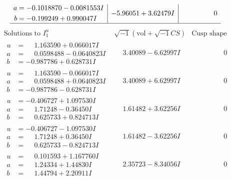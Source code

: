 \documentclass[1p]{elsarticle_modified}
\theoremstyle{definition}
\newcommand{\I}{\sqrt{-1}}
\begin{document}
$$\begin{array}{c|c|c}
\begin{aligned}
a &= -0.1018870 - 0.0081553 I \\
b &= -0.199249 + 0.990047 I\end{aligned}
 & -5.96051 + 3.62479 I & \phantom{-0.000000 } 0\\
 \hline 
 \end{array}$$\newpage$$\begin{array}{c|c|c}  
\text{Solutions to }I^u_{1}& \I (\text{vol} + \sqrt{-1}CS) & \text{Cusp shape}\\
 \hline 
\begin{aligned}
u &= \phantom{-}1.163590 + 0.066017 I \\
a &= \phantom{-}0.0598488 - 0.0640823 I \\
b &= -0.987786 + 0.628731 I\end{aligned}
 & \phantom{-}3.40089 - 6.62997 I & \phantom{-0.000000 } 0 \\ \hline\begin{aligned}
u &= \phantom{-}1.163590 - 0.066017 I \\
a &= \phantom{-}0.0598488 + 0.0640823 I \\
b &= -0.987786 - 0.628731 I\end{aligned}
 & \phantom{-}3.40089 + 6.62997 I & \phantom{-0.000000 } 0 \\ \hline\begin{aligned}
u &= -0.406727 + 1.097530 I \\
a &= \phantom{-}1.71248 - 0.36450 I \\
b &= \phantom{-}0.625733 + 0.824713 I\end{aligned}
 & \phantom{-}1.61482 + 3.62256 I & \phantom{-0.000000 } 0 \\ \hline\begin{aligned}
u &= -0.406727 - 1.097530 I \\
a &= \phantom{-}1.71248 + 0.36450 I \\
b &= \phantom{-}0.625733 - 0.824713 I\end{aligned}
 & \phantom{-}1.61482 - 3.62256 I & \phantom{-0.000000 } 0 \\ \hline\begin{aligned}
u &= \phantom{-}0.101593 + 1.167760 I \\
a &= \phantom{-}1.24334 + 1.44830 I \\
b &= \phantom{-}1.44794 + 2.20911 I\end{aligned}
 & \phantom{-}2.35723 - 8.34056 I & \phantom{-0.000000 } 0 \\ \hline\begin{aligned}

\end{aligned}
\end{array}$$
\end{document}

